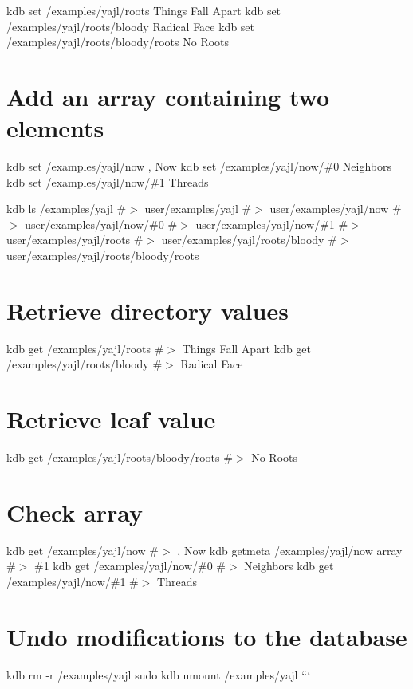 kdb set /examples/yajl/roots \textquotesingle{}Things Fall Apart\textquotesingle{} kdb set /examples/yajl/roots/bloody \textquotesingle{}Radical Face\textquotesingle{} kdb set /examples/yajl/roots/bloody/roots \textquotesingle{}No Roots\textquotesingle{}

\section*{Add an array containing two elements}

kdb set /examples/yajl/now \textquotesingle{}, Now\textquotesingle{} kdb set /examples/yajl/now/\#0 \textquotesingle{}Neighbors\textquotesingle{} kdb set /examples/yajl/now/\#1 \textquotesingle{}Threads\textquotesingle{}

kdb ls /examples/yajl \#$>$ user/examples/yajl \#$>$ user/examples/yajl/now \#$>$ user/examples/yajl/now/\#0 \#$>$ user/examples/yajl/now/\#1 \#$>$ user/examples/yajl/roots \#$>$ user/examples/yajl/roots/bloody \#$>$ user/examples/yajl/roots/bloody/roots

\section*{Retrieve directory values}

kdb get /examples/yajl/roots \#$>$ Things Fall Apart kdb get /examples/yajl/roots/bloody \#$>$ Radical Face

\section*{Retrieve leaf value}

kdb get /examples/yajl/roots/bloody/roots \#$>$ No Roots

\section*{Check array}

kdb get /examples/yajl/now \#$>$ , Now kdb getmeta /examples/yajl/now array \#$>$ \#1 kdb get /examples/yajl/now/\#0 \#$>$ Neighbors kdb get /examples/yajl/now/\#1 \#$>$ Threads

\section*{Undo modifications to the database}

kdb rm -\/r /examples/yajl sudo kdb umount /examples/yajl ```

